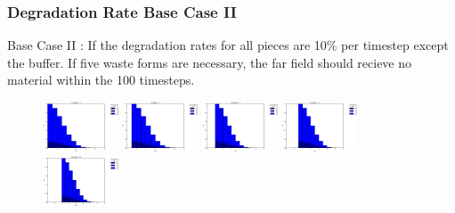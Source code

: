 

\begin{frame}
  \frametitle{Degradation Rate Base Case II}
  Base Case II : If the degradation rates for all pieces are 10\% per timestep 
  except the buffer. If five waste forms are necessary, the far field should 
  recieve no material within the 100 timesteps.

  \begin{figure}[htbp!]
    \begin{center}
      \includegraphics[width=0.2\textwidth]{cyder/images/buff0deg1.eps}
      \includegraphics[width=0.2\textwidth]{cyder/images/buff0deg4.eps}
      \includegraphics[width=0.2\textwidth]{cyder/images/buff0deg6.eps}
      \includegraphics[width=0.2\textwidth]{cyder/images/buff0deg8.eps}
      \includegraphics[width=0.2\textwidth]{cyder/images/buff0deg10.eps}
    \end{center}
  \end{figure}
\end{frame}

